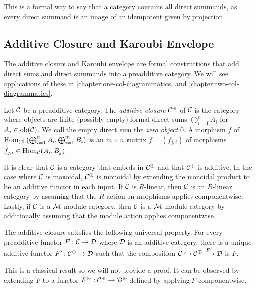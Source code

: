 This is a formal way to say that a category contains all direct summands, as every direct summand is an image of an idempotent given by projection.




\subsection*{Additive Closure and Karoubi Envelope}

The additive closure and Karoubi envelope are formal constructions that add direct sums and direct summands into a preadditive category. We will see applications of these in \autoref{chapter:one-col-diagrammatics} and \autoref{chapter:two-col-diagrammatics}.

\begin{definition}
    Let $\mathcal{C}$ be a preadditive category. The \textit{additive closure} $\mathcal{C}^\oplus$ of $\mathcal{C}$ is the category where objects are finite (possibly empty) formal direct sums $\bigoplus_{i=1}^n A_i$ for $A_i \in \operatorname{ob}(\mathcal{C})$. We call the empty direct sum the \textit{zero object} $0$. A morphism $f$ of $\operatorname{Hom}_{\mathcal{C}^\oplus}(\bigoplus_{i=1}^n A_i, \bigoplus_{i=1}^m B_i)$ is an $m \times n$ matrix $f = (f_{j,i})$ of morphisms $f_{j,i} \in \operatorname{Hom}_{\mathcal{C}}(A_i, B_j)$.
\end{definition}

It is clear that $\mathcal{C}$ is a category that embeds in $\mathcal{C}^\oplus$ and that $\mathcal{C}^\oplus$ is additive. In the case where $\mathcal{C}$ is monoidal, $\mathcal{C}^\oplus$ is monoidal by extending the monoidal product to be an additive functor in each input. If $\mathcal{C}$ is $R$-linear, then $\mathcal{C}$ is an $R$-linear category by assuming that the $R$-action on morphisms applies componentwise. Lastly, if $\mathcal{C}$ is a $\mathcal{M}$-module category, then $\mathcal{C}$ is a $\mathcal{M}$-module category by additionally assuming that the module action applies componentwise.

\begin{lemma}
    The additive closure satisfies the following universal property. For every preadditive functor $F: \mathcal{C} \to \mathcal{D}$ where $\mathcal{D}$ is an additive category, there is a unique additive functor $F': \mathcal{C}^\oplus \to \mathcal{D}$ such that the composition $\mathcal{C} \hookrightarrow \mathcal{C}^\oplus \xrightarrow{F'} \mathcal{D}$ is $F$.
\end{lemma}

This is a classical result so we will not provide a proof. It can be observed by extending $F$ to a functor $F^\oplus: \mathcal{C}^\oplus \to \mathcal{D}^\oplus$ defined by applying $F$ componentwise.

